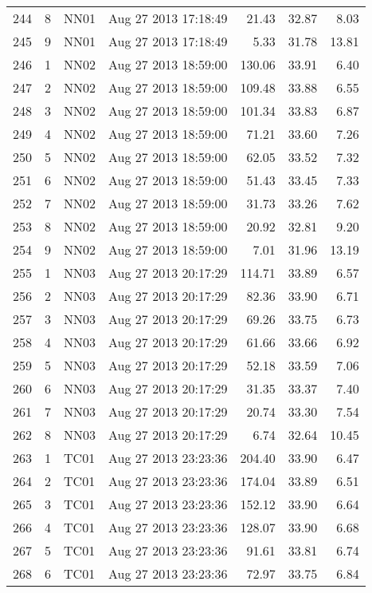 \documentclass{article}
\begin{document}
\begin{longtable}{ccllrrr}
244 & 8 & NN01 & Aug 27 2013 17:18:49 & 21.43 & 32.87 & 8.03 \\
245 & 9 & NN01 & Aug 27 2013 17:18:49 & 5.33 & 31.78 & 13.81 \\
\hline
246 & 1 & NN02 & Aug 27 2013 18:59:00 & 130.06 & 33.91 & 6.40 \\
247 & 2 & NN02 & Aug 27 2013 18:59:00 & 109.48 & 33.88 & 6.55 \\
248 & 3 & NN02 & Aug 27 2013 18:59:00 & 101.34 & 33.83 & 6.87 \\
249 & 4 & NN02 & Aug 27 2013 18:59:00 & 71.21 & 33.60 & 7.26 \\
250 & 5 & NN02 & Aug 27 2013 18:59:00 & 62.05 & 33.52 & 7.32 \\
251 & 6 & NN02 & Aug 27 2013 18:59:00 & 51.43 & 33.45 & 7.33 \\
252 & 7 & NN02 & Aug 27 2013 18:59:00 & 31.73 & 33.26 & 7.62 \\
253 & 8 & NN02 & Aug 27 2013 18:59:00 & 20.92 & 32.81 & 9.20 \\
254 & 9 & NN02 & Aug 27 2013 18:59:00 & 7.01 & 31.96 & 13.19 \\
\hline
255 & 1 & NN03 & Aug 27 2013 20:17:29 & 114.71 & 33.89 & 6.57 \\
256 & 2 & NN03 & Aug 27 2013 20:17:29 & 82.36 & 33.90 & 6.71 \\
257 & 3 & NN03 & Aug 27 2013 20:17:29 & 69.26 & 33.75 & 6.73 \\
258 & 4 & NN03 & Aug 27 2013 20:17:29 & 61.66 & 33.66 & 6.92 \\
259 & 5 & NN03 & Aug 27 2013 20:17:29 & 52.18 & 33.59 & 7.06 \\
260 & 6 & NN03 & Aug 27 2013 20:17:29 & 31.35 & 33.37 & 7.40 \\
261 & 7 & NN03 & Aug 27 2013 20:17:29 & 20.74 & 33.30 & 7.54 \\
262 & 8 & NN03 & Aug 27 2013 20:17:29 & 6.74 & 32.64 & 10.45 \\
\hline
263 & 1 & TC01 & Aug 27 2013 23:23:36 & 204.40 & 33.90 & 6.47 \\
264 & 2 & TC01 & Aug 27 2013 23:23:36 & 174.04 & 33.89 & 6.51 \\
265 & 3 & TC01 & Aug 27 2013 23:23:36 & 152.12 & 33.90 & 6.64 \\
266 & 4 & TC01 & Aug 27 2013 23:23:36 & 128.07 & 33.90 & 6.68 \\
267 & 5 & TC01 & Aug 27 2013 23:23:36 & 91.61 & 33.81 & 6.74 \\
268 & 6 & TC01 & Aug 27 2013 23:23:36 & 72.97 & 33.75 & 6.84 \\

\end{longtable}
\end{document}
